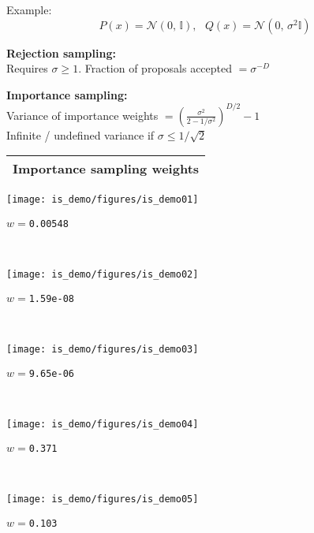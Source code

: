 \documentclass[25pt,landscape]{foils}
\newcommand{\Gray}{\textcolor{mygray}}
\newcommand{\Green}{\textcolor{mypine}}
\newcommand{\myfoilhead}[1]{
\newpage
\vspace*{-1cm}
\Gray{
\begin{tabular*}{\textwidth}{l}
{\bf \Huge #1} \\
\bottomrule
\end{tabular*}}}
\newcommand{\I}{\mathbb I}
\newcommand{\N}{\mathcal{N}}
\begin{document}
Example:
\[
P(x) = \N(0,\,\I),~~~Q(x) = \N(0,\,\sigma^2\I)
\]
\vfill

%
%

\Green{\bf Rejection sampling:}\\[0.1in]
Requires $\sigma\geq 1$. Fraction of proposals accepted $= \sigma^{-D}$\\

\vfill

%
%

\Green{\bf Importance sampling:}\\[0.1in]
Variance of importance weights $ = \left(\frac{\sigma^2}{2-1/\sigma^2}\right)^{D/2} - 1$\\[0.2in]
Infinite / undefined variance if $\sigma \leq 1/\sqrt{2}$

\myfoilhead{Importance sampling weights}

\vfill

\begin{minipage}{0.19\linewidth}\texttt{[image: is\_demo/figures/is\_demo01]}
\small \centerline{$w=$\texttt{0.00548}}\\
\end{minipage}
\begin{minipage}{0.19\linewidth}\texttt{[image: is\_demo/figures/is\_demo02]}
\small \centerline{$w=$\texttt{1.59e-08}}\\
\end{minipage}
\begin{minipage}{0.19\linewidth}\texttt{[image: is\_demo/figures/is\_demo03]}
\small \centerline{$w=$\texttt{9.65e-06}}\\
\end{minipage}
\begin{minipage}{0.19\linewidth}\texttt{[image: is\_demo/figures/is\_demo04]}
\small \centerline{$w=$\texttt{0.371}}\\
\end{minipage}
\begin{minipage}{0.19\linewidth}\texttt{[image: is\_demo/figures/is\_demo05]}
\small \centerline{$w=$\texttt{0.103}}\\
\end{minipage}
\end{document}
